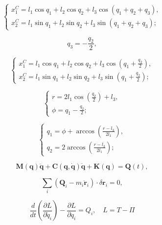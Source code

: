 \documentclass[conference]{IEEEtran}
\begin{document}
\begin{equation}
\begin{cases}
    x_{1}^C = l_1 \cos{q_1} + l_2 \cos{q_2} + l_3 \cos(q_1 + q_2 + q_3), \\
    x_{2}^C = l_1 \sin{q_1} + l_2 \sin{q_2} + l_3 \sin(q_1 + q_2 + q_3);
\end{cases}
\label{eq:x1_and_x2_equations_1}
\end{equation}

\begin{equation}
    q_3 = -\frac{q_2}{2},
\label{eq:q2_and_q3_relation}
\end{equation}

\begin{equation}
\begin{cases}
    x_{1}^C = l_1 \cos{q_1} + l_2 \cos{q_2} + l_3 \cos\left(q_1 + \frac{q_2}{2}\right), \\
    x_{2}^C = l_1 \sin{q_1} + l_2 \sin{q_2} + l_3 \sin\left(q_1 + \frac{q_2}{2}\right);
\end{cases}
\label{eq:x1_and_x2_equations_2}
\end{equation}

\begin{equation}
\begin{cases}
    r = 2l_1 \cos\left(\frac{q_2}{2}\right) + l_3, \\
    \phi = q_1 - \frac{q_2}{2};
\end{cases}
\label{eq:r_phi}
\end{equation}

\begin{equation}
\begin{cases}
    q_1 = \phi + \arccos\left(\frac{r - l_3}{2l_1}\right), \\
    q_2 = 2 \arccos\left(\frac{r - l_3}{2l_1}\right); %
\end{cases}
\label{eq:inverse_kinematics}
\end{equation}

\begin{equation}
\mathbf{M}(\mathbf{q}) \ddot{\mathbf{q}} + \mathbf{C}(\mathbf{q}, \dot{\mathbf{q}}) \dot{\mathbf{q}} + \mathbf{K}(\mathbf{q}) = \mathbf{Q}(t),
\label{eq:motion}
\end{equation}

\begin{equation}
\sum_i \left( \mathbf{Q}_i - m_i \ddot{\mathbf{r}}_i \right) \cdot \delta \mathbf{r}_i = 0,
\label{eq:dynamics}
\end{equation}

\begin{equation}
\frac{d}{dt} \left( \frac{\partial L}{\partial \dot{q}_i} \right) - \frac{\partial L}{\partial q_i} = Q_i, \quad L = T - \Pi
\label{eq:lagrange}
\end{equation}
\end{document}
